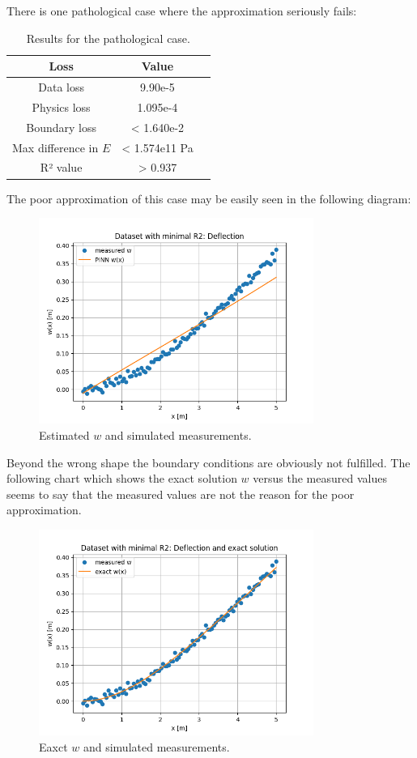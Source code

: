 \documentclass[a4paper,11pt]{article}
\begin{document}
There is one pathological case where the approximation seriously fails:
\begin{table}[h!]
\centering
\begin{tabular}{ccl}
\toprule
\textbf{Loss} & \textbf{Value}\\
\midrule
Data loss & 9.90e-5\\
Physics loss & 1.095e-4 \\
Boundary loss & < 1.640e-2 \\
Max difference in $E $ & < 1.574e11 Pa \\
R² value & > 0.937 \\
\bottomrule
\end{tabular}
\caption{Results for the pathological case.}
\end{table}
The poor approximation of this case may be easily seen in the following diagram:

\begin{figure}[H]
    \centering
    \includegraphics[width=0.8\textwidth]{Charts/Dataset with minimal R2Deflection_PINN.png}
    \caption{Estimated $w$ and simulated measurements.}
\end{figure}

Beyond the wrong shape the boundary conditions are obviously not fulfilled. The following chart which shows the exact solution $w$ versus the measured values seems to say that the measured values are not the reason for the poor approximation.

\begin{figure}[H]
    \centering
    \includegraphics[width=0.8\textwidth]{Charts/Dataset with minimal R2Deflection_exact.png}
    \caption{Eaxct $w$ and simulated measurements.}
\end{figure}
\end{document}
